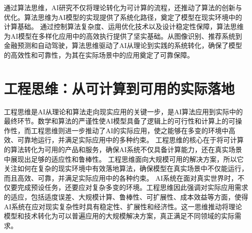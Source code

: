 通过算法思维，AI研究不仅将理论转化为可计算的流程，还推动了算法的创新与优化。算法思维为AI模型的实现提供了系统化路径，奠定了模型在现实环境中的计算基础。
通过控制算法复杂度、运用优化技术以及设计稳定性保障，算法思维为AI模型在多样化应用中的高效执行提供了坚实基础。从图像识别、推荐系统到金融预测和自动驾驶，算法思维驱动了AI从理论到实践的系统转化，确保了模型的高效性和可靠性，为其在实际场景中的应用奠定了可靠保障。
\section{工程思维：从可计算到可用的实际落地}


工程思维是AI从理论和算法走向现实应用的关键一步，是AI算法应用到实际中的最终环节。数学和算法的严谨性使AI模型具备了逻辑上的可行性和计算上的可操作性，而工程思维则进一步推动了AI的实际应用，使之能够在多变的环境中高效、可靠地运行，并满足实际应用中的多种约束。
工程思维的核心在于将可计算的算法转化为可用的产品和服务，确保AI系统不仅具备计算能力，还在真实场景中展现出足够的适应性和鲁棒性。
工程思维面向大规模可用的解决方案，所以它关注如何在复杂的现实环境中有效落地算法，确保模型在真实场景中不仅能运行，而且高效、可靠，并满足实际应用中的各种约束。
AI系统在面对真实世界时，不仅要完成预设任务，还要应对复杂多变的环境。工程思维因此强调对实际应用需求的适应，包括适度误差、大规模计算、鲁棒性、可扩展性、成本效益等方面，使得AI系统在应对现实复杂性时具有稳定性、扩展性和经济性。这一思维推动将理论模型和技术转化为可以普遍应用的大规模解决方案，真正满足不同领域的实际需求。
